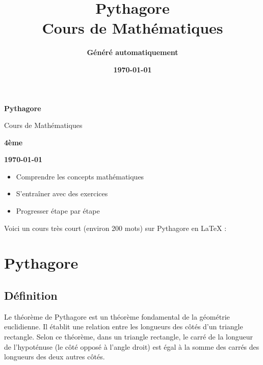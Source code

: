 \documentclass[12pt,a4paper]{article}
\title{\Huge\textcolor{primary}{\textbf{Pythagore}}\\[0.5cm]
\Large\textcolor{accent}{Cours de Mathématiques}}
\author{\Large\textcolor{secondary}{\textbf{Généré automatiquement}}}
\date{\Large\textcolor{warning}{\textbf{\today}}}
\begin{document}
\begin{titlepage}
\begin{center}
\vspace*{2cm}


\vspace{1cm}

{\Huge\textcolor{primary}{\textbf{Pythagore}}}

\vspace{0.5cm}

{\Large\textcolor{accent}{Cours de Mathématiques}}

\vspace{1cm}

{\Large\textcolor{secondary}{\textbf{4ème}}}

\vspace{0.5cm}

{\large\textcolor{warning}{\textbf{\today}}}

\vspace{2cm}

\begin{tcolorbox}[colback=lightgray,colframe=success,title=\textbf{\textcolor{success}{Objectifs du cours}}]
\begin{itemize}
\item Comprendre les concepts mathématiques
\item S'entraîner avec des exercices
\item Progresser étape par étape
\end{itemize}
\end{tcolorbox}

\end{center}
\end{titlepage}

\tableofcontents
\newpage

Voici un cours très court (environ 200 mots) sur Pythagore en LaTeX :



\section*{Pythagore}

\subsection*{Définition}
Le théorème de Pythagore est un théorème fondamental de la géométrie euclidienne. Il établit une relation entre les longueurs des côtés d'un triangle rectangle. Selon ce théorème, dans un triangle rectangle, le carré de la longueur de l'hypoténuse (le côté opposé à l'angle droit) est égal à la somme des carrés des longueurs des deux autres côtés.
\end{document}
